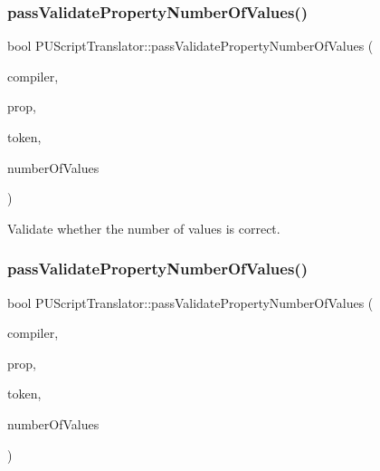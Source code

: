 \subsubsection{\texorpdfstring{pass\+Validate\+Property\+Number\+Of\+Values()}{passValidatePropertyNumberOfValues()}\hspace{0.1cm}{\footnotesize\ttfamily [1/2]}}
{\footnotesize\ttfamily bool P\+U\+Script\+Translator\+::pass\+Validate\+Property\+Number\+Of\+Values (\begin{DoxyParamCaption}\item[{\hyperlink{classPUScriptCompiler}{P\+U\+Script\+Compiler} $\ast$}]{compiler,  }\item[{\hyperlink{classPUPropertyAbstractNode}{P\+U\+Property\+Abstract\+Node} $\ast$}]{prop,  }\item[{const std\+::string \&}]{token,  }\item[{unsigned short}]{number\+Of\+Values }\end{DoxyParamCaption})}

Validate whether the number of values is correct. \mbox{\label{classPUScriptTranslator_aef77b0acaa2bc43fb6d59eb4f4484e72}} 
\subsubsection{\texorpdfstring{pass\+Validate\+Property\+Number\+Of\+Values()}{passValidatePropertyNumberOfValues()}\hspace{0.1cm}{\footnotesize\ttfamily [2/2]}}
{\footnotesize\ttfamily bool P\+U\+Script\+Translator\+::pass\+Validate\+Property\+Number\+Of\+Values (\begin{DoxyParamCaption}\item[{\hyperlink{classPUScriptCompiler}{P\+U\+Script\+Compiler} $\ast$}]{compiler,  }\item[{\hyperlink{classPUPropertyAbstractNode}{P\+U\+Property\+Abstract\+Node} $\ast$}]{prop,  }\item[{const std\+::string \&}]{token,  }\item[{unsigned short}]{number\+Of\+Values }\end{DoxyParamCaption})}

